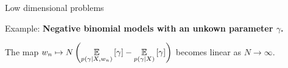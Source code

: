 
\begin{frame}[t]{Low dimensional problems}


Example: \textbf{Negative binomial models with an unkown parameter $\gamma$.}

\LowDimAccuracyGraph{}



%


The map $w_n \mapsto N \left( \underset{p(\gamma \vert X, w_n)}{\mathbb{E}}\left[\gamma\right] -
\underset{p(\gamma \vert X)}{\mathbb{E}}\left[\gamma\right] \right)$ becomes linear as $N
\rightarrow \infty$.

\end{frame}






